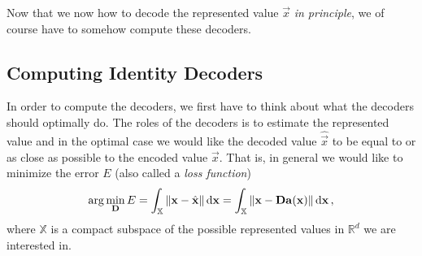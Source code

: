 \documentclass[10pt,letterpaper,oneside]{article}
\begin{document}
Now that we now how to decode the represented value $\vec x$ \emph{in principle}, we of course have to somehow compute these decoders.


\subsection{Computing Identity Decoders}

In order to compute the decoders, we first have to think about what the decoders should optimally do. The roles of the decoders is to estimate the represented value and in the optimal case we would like the decoded value $\hat{\vec x}$ to be equal to or as close as possible to the encoded value $\vec x$. That is, in general we would like to minimize the error $E$ (also called a \emph{loss function})
\begin{align}
	\arg\min_{{\mathbf{D}}} E = \int_{\mathbb{X}} \|{\mathbf{x}} - \hat{{\mathbf{x}}}\| \,\mathrm{d}{\mathbf{x}} = \int_{\mathbb{X}} \|{\mathbf{x}} - {\mathbf{D}} {\mathbf{a}}({\mathbf{x}})\| \,\mathrm{d}{\mathbf{x}} \,,
	\label{eqn:optimisation_problem}
\end{align}
where $\mathbb{X}$ is a compact subspace of the possible represented values in $\mathbb{R}^d$ we are interested in.

\end{document}
